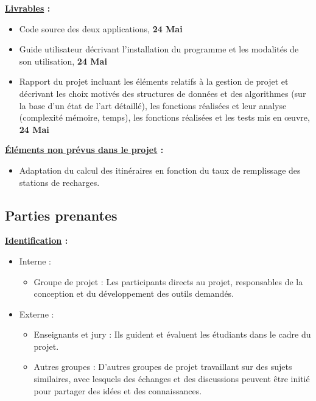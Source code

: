 \documentclass[a4paper, 12pt]{report}
\begin{document}
\textbf{\underline{Livrables} :}
\begin{itemize}
  \item Code source des deux applications, \textbf{24 Mai}
  \item Guide utilisateur décrivant l'installation du programme et les modalités de son utilisation, \textbf{24 Mai}
  \item Rapport du projet incluant les éléments relatifs à la gestion de projet et décrivant les choix motivés des structures de données et des algorithmes (sur la base d'un état de l'art détaillé), les
fonctions réalisées et leur analyse (complexité mémoire, temps), les fonctions réalisées et les tests mis en œuvre, \textbf{24 Mai}
\end{itemize}
\bigskip

\textbf{\underline{Éléments non prévus dans le projet} :}
\begin{itemize}
  \item Adaptation du calcul des itinéraires en fonction du taux de remplissage des stations de recharges.
\end{itemize}

        \subsection{Parties prenantes}

\textbf{\underline{Identification} :}
\begin{itemize}
  \item Interne :
  \begin{itemize}
      \item Groupe de projet : Les participants directs au projet, responsables de la conception et du développement des outils demandés.
  \end{itemize}
  \item Externe :
  \begin{itemize}
      \item Enseignants et jury : Ils guident et évaluent les étudiants dans le cadre du projet.
      \item Autres groupes : D'autres groupes de projet travaillant sur des sujets similaires, avec lesquels des échanges et des discussions peuvent être initié pour partager des idées et des connaissances.
  \end{itemize}
\end{itemize}
\bigskip
\end{document}
